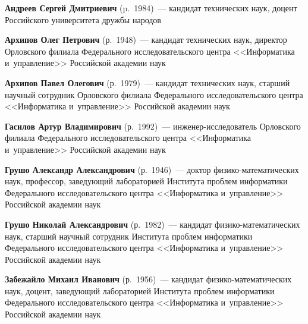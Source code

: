 \begin{multicols}{2}

\noindent
\textbf{Андреев Сергей Дмитриевич} (p.\ 1984)~---
кандидат технических наук, доцент Российского университета дружбы народов 

\vspace*{3pt}

\noindent
\textbf{Архипов Олег Петрович} (р.\ 1948)~---
кандидат технических наук, директор Орловского филиала Федерального исследовательского 
центра <<Информатика и~управ\-ле\-ние>> Российской академии наук

\vspace*{3pt}

\noindent
\textbf{Архипов Павел Олегович} (р.\ 1979)~--- 
кандидат технических наук, старший научный сотрудник Орловского филиала Федерального 
исследовательского центра <<Информатика и~управ\-ле\-ние>> Российской академии наук

\vspace*{3pt}

\noindent
\textbf{Гасилов Артур Владимирович} (р.\ 1992)~---
ин\-же\-нер-ис\-сле\-до\-ва\-тель Орловского филиала Федерального исследовательского 
центра <<Информатика и~управ\-ле\-ние>> Российской академии наук

\vspace*{3pt}

\noindent
\textbf{Грушо Александр Александрович} (р.\ 1946)~---
доктор фи\-зи\-ко-ма\-те\-ма\-ти\-че\-ских наук, 
профессор, заведующий лабораторией Института проб\-лем 
информатики Федерального исследовательского центра <<Информатика и~управ\-ле\-ние>> 
Российской академии наук

\vspace*{3pt}

\noindent
\textbf{Грушо Николай Александрович} (р.\ 1982)~---
кандидат фи\-зи\-ко-ма\-те\-ма\-ти\-че\-ских наук, старший научный сотрудник 
Института проб\-лем информатики Федерального исследовательского центра 
<<Информатика и~управ\-ле\-ние>> Российской академии наук



\vspace*{3pt}

\noindent
\textbf{Забежайло Михаил Иванович} (р.\ 1956)~---
кандидат фи\-зи\-ко-ма\-те\-ма\-ти\-че\-ских наук, доцент, заведующий лабораторией 
Института проб\-лем информатики Федерального исследовательского центра 
<<Информатика и~управ\-ле\-ние>> Российской академии наук


\end{multicols}
